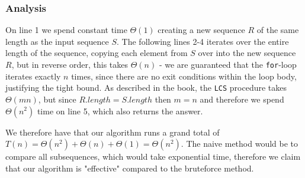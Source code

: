 \documentclass[11pt,english]{article}
\begin{document}
\subsubsection*{Analysis}
On line 1 we spend constant time $\Theta(1)$ creating a new sequence $R$ of
the same length as the input sequence $S$. The following lines 2-4 iterates
over the entire length of the sequence, copying each element from $S$ over
into the new sequence $R$, but in reverse order, this takes $\Theta(n)$ - we
are guaranteed that the \texttt{for}-loop iterates exactly $n$ times, since 
there are no exit conditions within the loop body, justifying the tight bound. As described in the book, the \texttt{LCS} procedure takes $\Theta(mn)$, but
since $R.length = S.length$ then $m = n$ and therefore we spend $\Theta(n^2)$
time on line 5, which also returns the answer.

We therefore have that our algorithm runs a grand total of $T(n) =
\Theta(n^2) + \Theta(n) + \Theta(1) = \Theta(n^2)$. The naive method would be
to compare all subsequences, which would take exponential time, therefore we
claim that our algorithm is "effective" compared to the bruteforce method.







\end{document}
